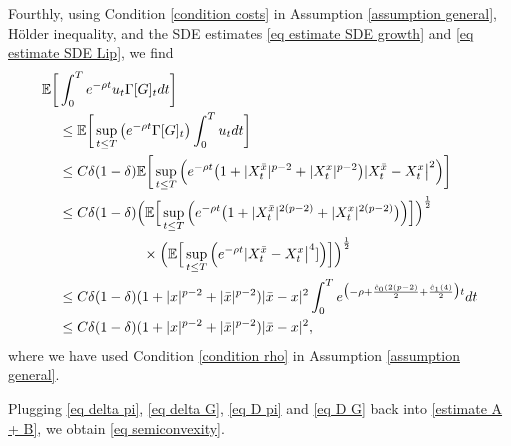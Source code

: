\documentclass[11pt]{amsart}
\theoremstyle{plain}
\def \dd{{\rm d}}
\numberwithin{equation}{section}
\begin{document}
Fourthly, using Condition \ref{condition costs} in Assumption \ref{assumption general}, Hölder inequality, and the SDE estimates \eqref{eq estimate SDE growth} and \eqref{eq estimate SDE Lip}, we find
\begin{equation}
    \label{eq D G}
    \begin{aligned}
        \mathbb{E} \bigg[ & \int_0^T e^{-\rho t} u_t \Gamma [ G] _t   \dd t \bigg] \\
        & \leq  \mathbb{E} \bigg[ \sup_{t \leq T} \big( e^{-\rho t}   \Gamma [ G] _t \big)   \int_0^T  u_t \dd t \bigg] \\
        & \leq C \delta (1-\delta) \mathbb E \bigg[ \sup_{t \leq T} \Big( e^{-\rho t}  \big( 
         1+  | X^{\bar x} _t |^{p-2}   +  | X^x _t |^{p-2} \big) |  X^{\bar x} _t - X ^x_t \big|^2 \Big)  \bigg] \\
        & \leq C \delta (1-\delta) \Big( \mathbb E \Big[ \sup_{t \leq T} \Big( e^{-\rho t}  \big( 
        1+ |X^{\bar x} _t |^{2(p-2)}  + | X^x _t |^{2(p-2)} \big) \Big) \Big] \Big)^{\frac 12} \\
        & \qquad  \qquad  \qquad   \times         \Big( \mathbb E \Big[ \sup_{t \leq T} \Big( e^{-\rho t} | X^{\bar x} _t - X^x_t \big|^4 ] \Big)  \Big] \Big)^{\frac12}\\
        &  \leq C \delta (1-\delta) ( 1 + |{x}|^{p-2} + |\bar{x}|^{p-2}) |\bar{x} - x|^2 \int_0^T e^{\big(-\rho + \frac{\hat c _0 (2(p-2)}{2} + \frac{\hat c _1 (4)}2 \big) t} \dd t \\
& \leq C \delta (1-\delta) ( 1 + |{x}|^{p-2} + |\bar{x}|^{p-2})  |\bar{x} - x|^2, 
    \end{aligned}
\end{equation}
where we have used Condition \ref{condition rho} in Assumption \ref{assumption general}.

Plugging \eqref{eq delta pi}, \eqref{eq delta G}, \eqref{eq D pi} and \eqref{eq D G} back into \eqref{estimate A + B}, we obtain \eqref{eq semiconvexity}.
\end{document}
